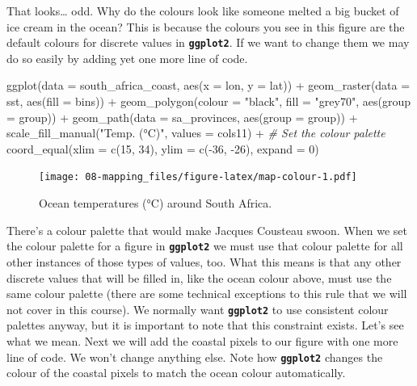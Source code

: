 \documentclass[
]{book}
\newenvironment{Shaded}{\begin{snugshade}}{\end{snugshade}}
\newcommand{\AttributeTok}[1]{\textcolor[rgb]{0.77,0.63,0.00}{#1}}
\newcommand{\CommentTok}[1]{\textcolor[rgb]{0.56,0.35,0.01}{\textit{#1}}}
\newcommand{\DecValTok}[1]{\textcolor[rgb]{0.00,0.00,0.81}{#1}}
\newcommand{\FunctionTok}[1]{\textcolor[rgb]{0.00,0.00,0.00}{#1}}
\newcommand{\NormalTok}[1]{#1}
\newcommand{\SpecialCharTok}[1]{\textcolor[rgb]{0.00,0.00,0.00}{#1}}
\newcommand{\StringTok}[1]{\textcolor[rgb]{0.31,0.60,0.02}{#1}}
\begin{document}
That looks\ldots{} odd. Why do the colours look like someone melted a big bucket of ice cream in the ocean? This is because the colours you see in this figure are the default colours for discrete values in \textbf{\texttt{ggplot2}}. If we want to change them we may do so easily by adding yet one more line of code.

\begin{Shaded}
\begin{Highlighting}[]
\FunctionTok{ggplot}\NormalTok{(}\AttributeTok{data =}\NormalTok{ south\_africa\_coast, }\FunctionTok{aes}\NormalTok{(}\AttributeTok{x =}\NormalTok{ lon, }\AttributeTok{y =}\NormalTok{ lat)) }\SpecialCharTok{+}
  \FunctionTok{geom\_raster}\NormalTok{(}\AttributeTok{data =}\NormalTok{ sst, }\FunctionTok{aes}\NormalTok{(}\AttributeTok{fill =}\NormalTok{ bins)) }\SpecialCharTok{+}
  \FunctionTok{geom\_polygon}\NormalTok{(}\AttributeTok{colour =} \StringTok{"black"}\NormalTok{, }\AttributeTok{fill =} \StringTok{"grey70"}\NormalTok{, }\FunctionTok{aes}\NormalTok{(}\AttributeTok{group =}\NormalTok{ group)) }\SpecialCharTok{+}
  \FunctionTok{geom\_path}\NormalTok{(}\AttributeTok{data =}\NormalTok{ sa\_provinces, }\FunctionTok{aes}\NormalTok{(}\AttributeTok{group =}\NormalTok{ group)) }\SpecialCharTok{+}
  \FunctionTok{scale\_fill\_manual}\NormalTok{(}\StringTok{"Temp. (°C)"}\NormalTok{, }\AttributeTok{values =}\NormalTok{ cols11) }\SpecialCharTok{+} \CommentTok{\# Set the colour palette}
  \FunctionTok{coord\_equal}\NormalTok{(}\AttributeTok{xlim =} \FunctionTok{c}\NormalTok{(}\DecValTok{15}\NormalTok{, }\DecValTok{34}\NormalTok{), }\AttributeTok{ylim =} \FunctionTok{c}\NormalTok{(}\SpecialCharTok{{-}}\DecValTok{36}\NormalTok{, }\SpecialCharTok{{-}}\DecValTok{26}\NormalTok{), }\AttributeTok{expand =} \DecValTok{0}\NormalTok{)}
\end{Highlighting}
\end{Shaded}

\begin{figure}
\centering
\texttt{[image: 08-mapping\_files/figure-latex/map-colour-1.pdf]}
\caption{\label{fig:map-colour}Ocean temperatures (°C) around South Africa.}
\end{figure}

There's a colour palette that would make Jacques Cousteau swoon. When we set the colour palette for a figure in \textbf{\texttt{ggplot2}} we must use that colour palette for all other instances of those types of values, too. What this means is that any other discrete values that will be filled in, like the ocean colour above, must use the same colour palette (there are some technical exceptions to this rule that we will not cover in this course). We normally want \textbf{\texttt{ggplot2}} to use consistent colour palettes anyway, but it is important to note that this constraint exists. Let's see what we mean. Next we will add the coastal pixels to our figure with one more line of code. We won't change anything else. Note how \textbf{\texttt{ggplot2}} changes the colour of the coastal pixels to match the ocean colour automatically.
\end{document}
